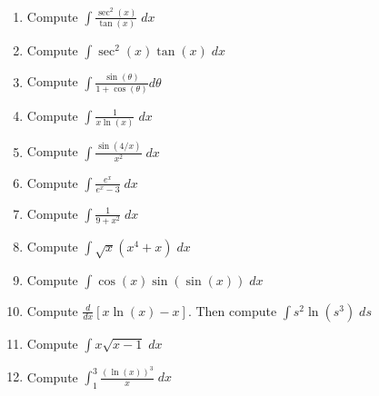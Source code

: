 \documentclass[11pt,fleqn]{article}
\newcommand{\be}{\begin{enumerate}}
\newcommand{\ee}{\end{enumerate}}
\begin{document}
\setlength{\parindent}{0cm}
\renewcommand{\headrulewidth}{0pt}
\newcommand{\blank}[1]{\rule{#1}{0.75pt}}
\renewcommand{\d}{\displaystyle}
\vspace*{-0.7in}
\begin{center}
  \Large {}
\end{center}

\be
\item Compute $\d \int \frac{\sec^2(x)}{\tan(x)}\;dx$
\vfill

\item Compute $\d \int \sec^2(x) \tan(x)\;dx$
\vfill

\item Compute $ \int \frac{\sin(\theta)}{1+\cos(\theta)}d\theta$
\vfill
\newpage
\item Compute $\d \int \frac{1}{x\ln(x)}\;dx$
\vfill

\item Compute $\d \int \frac{\sin(4/x)}{x^2}\;dx$
\vfill

\item Compute $\d \int \frac{e^x}{e^x-3}\;dx$
\vfill

\newpage
\item Compute $\d \int \frac{1}{9+x^2}\;dx$
\vfill

\item Compute $\d \int \sqrt{x}(x^4+x)\; dx$
\vfill

\item Compute $\d \int \cos(x)\sin(\sin(x)) \; dx$
\vfill

\newpage
\item Compute $\d \frac{d}{dx} \left[ x\ln(x)-x\right]$.  Then compute  $\int s^2 \ln(s^3)\; ds$
\vfill

\item Compute $\d\int x\sqrt{x-1}\; dx$
\vfill

\item Compute $\d \int_1^3 \frac{(\ln(x))^3}{x}\; dx$
\vfill
\ee
\end{document}
